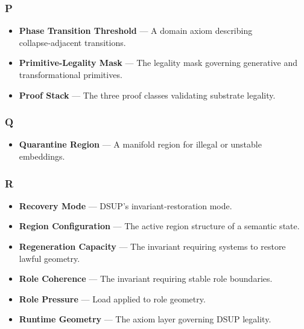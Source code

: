 \subsubsection*{P}
\begin{itemize}
    \item \textbf{Phase Transition Threshold} — A domain axiom describing
    collapse‑adjacent transitions.

    \item \textbf{Primitive-Legality Mask} — The legality mask governing
    generative and transformational primitives.

    \item \textbf{Proof Stack} — The three proof classes validating substrate
    legality.
\end{itemize}


\subsubsection*{Q}
\begin{itemize}
    \item \textbf{Quarantine Region} — A manifold region for illegal or unstable
    embeddings.
\end{itemize}


\subsubsection*{R}
\begin{itemize}
    \item \textbf{Recovery Mode} — DSUP’s invariant‑restoration mode.

    \item \textbf{Region Configuration} — The active region structure of a
    semantic state.

    \item \textbf{Regeneration Capacity} — The invariant requiring systems to
    restore lawful geometry.

    \item \textbf{Role Coherence} — The invariant requiring stable role
    boundaries.

    \item \textbf{Role Pressure} — Load applied to role geometry.

    \item \textbf{Runtime Geometry} — The axiom layer governing DSUP legality.
\end{itemize}



